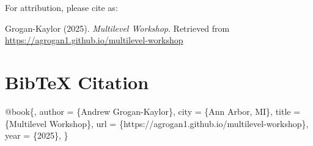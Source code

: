 \documentclass[
  letterpaper,
  DIV=11,
  numbers=noendperiod]{scrreprt}
\newenvironment{Shaded}{\begin{snugshade}}{\end{snugshade}}
\newcommand{\NormalTok}[1]{\textcolor[rgb]{0.00,0.23,0.31}{#1}}
\begin{document}

For attribution, please cite as:

Grogan-Kaylor (2025). \emph{Multilevel Workshop}. Retrieved from
\url{https://agrogan1.github.io/multilevel-workshop}

\section*{BibTeX Citation}\label{bibtex-citation}


\begin{Shaded}
\begin{Highlighting}[]
\NormalTok{@book\{,}
\NormalTok{   author = \{Andrew Grogan{-}Kaylor\},}
\NormalTok{   city = \{Ann Arbor, MI\},}
\NormalTok{   title = \{Multilevel Workshop\},}
\NormalTok{   url = \{https://agrogan1.github.io/multilevel{-}workshop\},}
\NormalTok{   year = \{2025\},}
\NormalTok{\}}
\end{Highlighting}
\end{Shaded}
\end{document}
